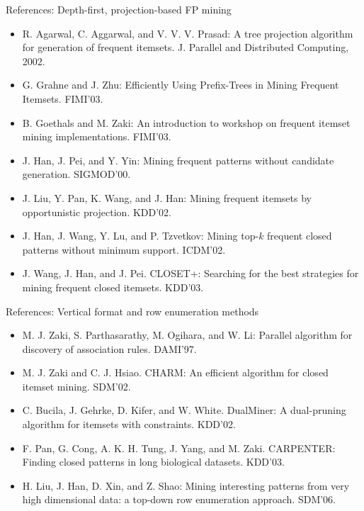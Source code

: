 \documentclass[aspectratio=169,t,xcolor=dvipsnames]{beamer}
\begin{document}
  {
    \begin{frame}{References: Depth-first, projection-based FP mining}
    \begin{itemize}
      \item R. Agarwal, C. Aggarwal, and V. V. V. Prasad: A tree projection algorithm for generation of frequent itemsets. J. Parallel and Distributed Computing, 2002.
      \item G. Grahne and J. Zhu: Efficiently Using Prefix-Trees in Mining Frequent Itemsets. FIMI'03.
      \item B. Goethals and M. Zaki: An introduction to workshop on frequent itemset mining implementations. FIMI'03.
      \item J. Han, J. Pei, and Y. Yin: Mining frequent patterns without candidate generation. SIGMOD'00.
      \item J. Liu, Y. Pan, K. Wang, and J. Han: Mining frequent itemsets by opportunistic projection. KDD'02.
      \item J. Han, J. Wang, Y. Lu, and P. Tzvetkov: Mining top-$k$ frequent closed patterns without minimum support. ICDM'02.
      \item J. Wang, J. Han, and J. Pei.  CLOSET+: Searching for the best strategies for mining frequent closed itemsets. KDD'03.
    \end{itemize}
    \end{frame}
  }

  {
    \begin{frame}{References: Vertical format and row enumeration methods}
    \begin{itemize}
      \item M. J. Zaki, S. Parthasarathy, M. Ogihara, and W. Li: Parallel algorithm for discovery of association rules. DAMI'97.
      \item M. J. Zaki and C. J. Hsiao. CHARM: An efficient algorithm for closed itemset mining. SDM'02.
      \item C. Bucila, J. Gehrke, D. Kifer, and W. White. DualMiner: A dual-pruning algorithm for itemsets with constraints. KDD'02.
      \item F. Pan, G. Cong, A. K. H. Tung, J. Yang, and M. Zaki. CARPENTER: Finding closed patterns in long biological datasets. KDD'03.
      \item H. Liu, J. Han, D. Xin, and Z. Shao: Mining interesting patterns from very high dimensional data: a top-down row enumeration approach. SDM'06.
    \end{itemize}
    \end{frame}
  }
\end{document}
